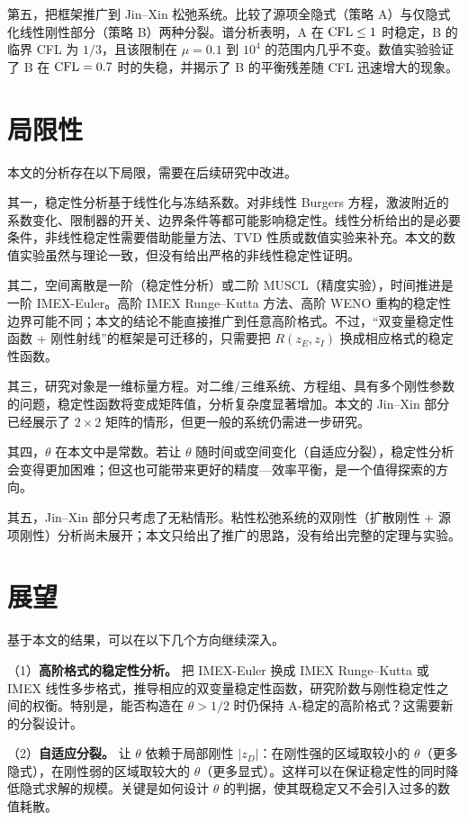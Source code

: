 第五，把框架推广到 Jin--Xin 松弛系统。比较了源项全隐式（策略 A）与仅隐式化线性刚性部分（策略 B）两种分裂。谱分析表明，A 在 $\mathrm{CFL}\le1$ 时稳定，B 的临界 CFL 为 $1/3$，且该限制在 $\mu=0.1$ 到 $10^{4}$ 的范围内几乎不变。数值实验验证了 B 在 $\mathrm{CFL}=0.7$ 时的失稳，并揭示了 B 的平衡残差随 CFL 迅速增大的现象。

\section{局限性}

本文的分析存在以下局限，需要在后续研究中改进。

其一，稳定性分析基于线性化与冻结系数。对非线性 Burgers 方程，激波附近的系数变化、限制器的开关、边界条件等都可能影响稳定性。线性分析给出的是必要条件，非线性稳定性需要借助能量方法、TVD 性质或数值实验来补充。本文的数值实验虽然与理论一致，但没有给出严格的非线性稳定性证明。

其二，空间离散是一阶（稳定性分析）或二阶 MUSCL（精度实验），时间推进是一阶 IMEX-Euler。高阶 IMEX Runge--Kutta 方法、高阶 WENO 重构的稳定性边界可能不同；本文的结论不能直接推广到任意高阶格式。不过，“双变量稳定性函数 + 刚性射线”的框架是可迁移的，只需要把 $R(z_E,z_I)$ 换成相应格式的稳定性函数。

其三，研究对象是一维标量方程。对二维/三维系统、方程组、具有多个刚性参数的问题，稳定性函数将变成矩阵值，分析复杂度显著增加。本文的 Jin--Xin 部分已经展示了 $2\times2$ 矩阵的情形，但更一般的系统仍需进一步研究。

其四，$\theta$ 在本文中是常数。若让 $\theta$ 随时间或空间变化（自适应分裂），稳定性分析会变得更加困难；但这也可能带来更好的精度—效率平衡，是一个值得探索的方向。

其五，Jin--Xin 部分只考虑了无粘情形。粘性松弛系统的双刚性（扩散刚性 + 源项刚性）分析尚未展开；本文只给出了推广的思路，没有给出完整的定理与实验。

\section{展望}

基于本文的结果，可以在以下几个方向继续深入。

（1）\textbf{高阶格式的稳定性分析。} 把 IMEX-Euler 换成 IMEX Runge--Kutta 或 IMEX 线性多步格式，推导相应的双变量稳定性函数，研究阶数与刚性稳定性之间的权衡。特别是，能否构造在 $\theta>1/2$ 时仍保持 A-稳定的高阶格式？这需要新的分裂设计。

（2）\textbf{自适应分裂。} 让 $\theta$ 依赖于局部刚性 $|z_D|$：在刚性强的区域取较小的 $\theta$（更多隐式），在刚性弱的区域取较大的 $\theta$（更多显式）。这样可以在保证稳定性的同时降低隐式求解的规模。关键是如何设计 $\theta$ 的判据，使其既稳定又不会引入过多的数值耗散。

